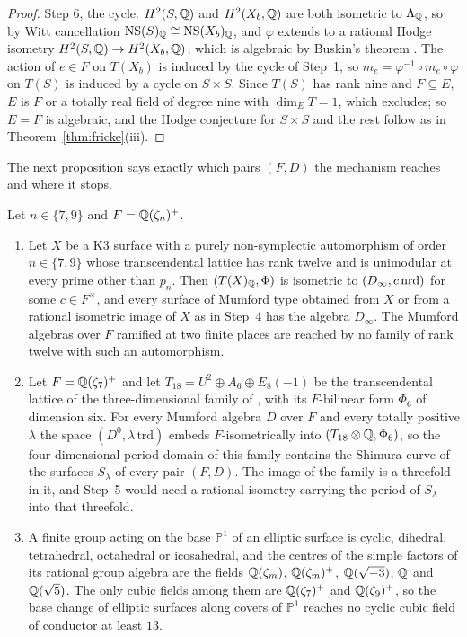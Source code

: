 \begin{proof}
Step 6, the cycle. $H^{2}(S,\mathbb{Q})$ and $H^{2}(X_{b},\mathbb{Q})$ are both isometric to $\Lambda_{\mathbb{Q}}$, so by Witt cancellation $\mathrm{NS}(S)_{\mathbb{Q}}\cong\mathrm{NS}(X_{b})_{\mathbb{Q}}$, and $\varphi$ extends to a rational Hodge isometry $H^{2}(S,\mathbb{Q})\to H^{2}(X_{b},\mathbb{Q})$, which is algebraic by Buskin's theorem \cite{Bus19}. The action of $e\in F$ on $T(X_{b})$ is induced by the cycle of Step~1, so $m_{e}=\varphi^{-1}\circ m_{e}\circ\varphi$ on $T(S)$ is induced by a cycle on $S\times S$. Since $T(S)$ has rank nine and $F\subseteq E$, $E$ is $F$ or a totally real field of degree nine with $\dim_{E}T=1$, which \cite{vG08} excludes; so $E=F$ is algebraic, and the Hodge conjecture for $S\times S$ and the rest follow as in Theorem~\ref{thm:fricke}(iii).
\end{proof}

The next proposition says exactly which pairs $(F,D)$ the mechanism reaches and where it stops.

\begin{proposition}\label{prop:cubicstop}
Let $n\in\{7,9\}$ and $F=\mathbb{Q}(\zeta_{n})^{+}$.
\begin{enumerate}[label=\textup{(\roman*)},leftmargin=2.4em,itemsep=2pt]
\item Let $X$ be a K3 surface with a purely non-symplectic automorphism of order $n\in\{7,9\}$ whose transcendental lattice has rank twelve and is unimodular at every prime other than $p_{n}$. Then $(T(X)_{\mathbb{Q}},\Phi)$ is isometric to $(D_{\infty},c\,\mathrm{nrd})$ for some $c\in F^{\times}$, and every surface of Mumford type obtained from $X$ or from a rational isometric image of $X$ as in Step~4 has the algebra $D_{\infty}$. The Mumford algebras over $F$ ramified at two finite places are reached by no family of rank twelve with such an automorphism.
\item Let $F=\mathbb{Q}(\zeta_{7})^{+}$ and let $T_{18}=U^{2}\oplus A_{6}\oplus E_{8}(-1)$ be the transcendental lattice of the three-dimensional family of \cite[\S5.4]{vGS25}, with its $F$-bilinear form $\Phi_{6}$ of dimension six. For every Mumford algebra $D$ over $F$ and every totally positive $\lambda$ the space $(D^{0},\lambda\,\mathrm{trd})$ embeds $F$-isometrically into $(T_{18}\otimes\mathbb{Q},\Phi_{6})$, so the four-dimensional period domain of this family contains the Shimura curve of the surfaces $S_{\lambda}$ of every pair $(F,D)$. The image of the family is a threefold in it, and Step~5 would need a rational isometry carrying the period of $S_{\lambda}$ into that threefold.
\item A finite group acting on the base $\mathbb{P}^{1}$ of an elliptic surface is cyclic, dihedral, tetrahedral, octahedral or icosahedral, and the centres of the simple factors of its rational group algebra are the fields $\mathbb{Q}(\zeta_{m})$, $\mathbb{Q}(\zeta_{m})^{+}$, $\mathbb{Q}(\sqrt{-3})$, $\mathbb{Q}$ and $\mathbb{Q}(\sqrt5)$. The only cubic fields among them are $\mathbb{Q}(\zeta_{7})^{+}$ and $\mathbb{Q}(\zeta_{9})^{+}$, so the base change of elliptic surfaces along covers of $\mathbb{P}^{1}$ reaches no cyclic cubic field of conductor at least $13$.
\end{enumerate}
\end{proposition}

